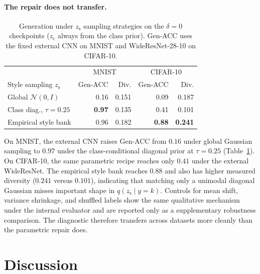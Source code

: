 \documentclass[letterpaper]{article}
\newcommand{\zc}{z_{\mathrm{c}}}
\newcommand{\zs}{z_{\mathrm{s}}}
\begin{document}
\paragraph{The repair does not transfer.}

\begin{table}[t]
\centering
\scriptsize
\setlength{\tabcolsep}{2.5pt}
\caption{Generation under $\zs$ sampling strategies on the $\delta{=}0$
checkpoints ($\zc$ always from the class prior). Gen-ACC uses the fixed
external CNN on MNIST and WideResNet-28-10 on CIFAR-10.}
\label{tab:sampling}
\begin{tabular}{lrrrr}
\toprule
& \multicolumn{2}{c}{MNIST} & \multicolumn{2}{c}{CIFAR-10} \\
Style sampling $\zs$ & Gen-ACC & Div. & Gen-ACC & Div. \\
\midrule
Global $\mathcal N(0,I)$ & 0.16 & 0.151 &
 0.09 & 0.187 \\
Class diag., $\tau{=}0.25$ & \textbf{0.97} & 0.135 & 0.41 & 0.101 \\
Empirical style bank & 0.96 & 0.182 &
\textbf{0.88} & \textbf{0.241} \\
\bottomrule
\end{tabular}
\end{table}

On MNIST, the external CNN raises Gen-ACC from $0.16$ under global Gaussian
sampling to $0.97$ under the class-conditional diagonal prior at
$\tau{=}0.25$ (Table~\ref{tab:sampling}). On CIFAR-10, the same parametric
recipe reaches only $0.41$ under the external WideResNet. The empirical
style bank reaches $0.88$ and also has higher measured diversity ($0.241$
versus $0.101$), indicating that matching only a unimodal diagonal Gaussian
misses important shape in $q(\zs\mid y{=}k)$. Controls for mean shift,
variance shrinkage, and shuffled labels show the same qualitative mechanism
under the internal evaluator and are reported only as a supplementary
robustness comparison. The diagnostic therefore transfers across datasets
more cleanly than the parametric repair does.

\section{Discussion}
\end{document}
